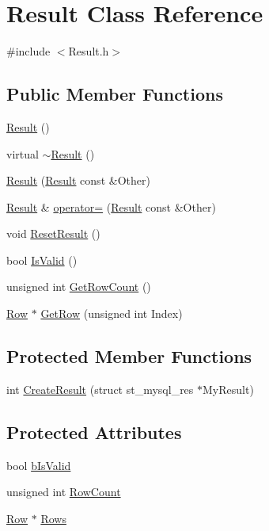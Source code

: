 \hypertarget{class_result}{}\section{Result Class Reference}
\label{class_result}


{\ttfamily \#include $<$Result.\+h$>$}

\subsection*{Public Member Functions}
\begin{DoxyCompactItemize}
\item 
\hyperlink{class_result_a90f44667e23d25ccdeac37f00a74657b}{Result} ()
\item 
virtual \hyperlink{class_result_ab83cf33a31236b3da75d66aaf9a05ed0}{$\sim$\+Result} ()
\item 
\hyperlink{class_result_a3c4a349c3795ad219e8d5ca1d44c62a4}{Result} (\hyperlink{class_result}{Result} const \&Other)
\item 
\hyperlink{class_result}{Result} \& \hyperlink{class_result_abb25eb344b66cd92d9d079dc19bc05e1}{operator=} (\hyperlink{class_result}{Result} const \&Other)
\item 
void \hyperlink{class_result_a806a828b9546dea0761db7a2d01a4563}{Reset\+Result} ()
\item 
bool \hyperlink{class_result_a6dcbd5f9c93b82027e4cfa4db492fe31}{Is\+Valid} ()
\item 
unsigned int \hyperlink{class_result_aedf87b5720707b42129079aba141a267}{Get\+Row\+Count} ()
\item 
\hyperlink{class_row}{Row} $\ast$ \hyperlink{class_result_ad40131fa88f4c69fb6713e51568b86c9}{Get\+Row} (unsigned int Index)
\end{DoxyCompactItemize}
\subsection*{Protected Member Functions}
\begin{DoxyCompactItemize}
\item 
int \hyperlink{class_result_ac36445abfe2d25c756412d3cfed9a2ca}{Create\+Result} (struct st\+\_\+mysql\+\_\+res $\ast$My\+Result)
\end{DoxyCompactItemize}
\subsection*{Protected Attributes}
\begin{DoxyCompactItemize}
\item 
bool \hyperlink{class_result_acfc4ae3c85dc1af5f56667dfbf34ab45}{b\+Is\+Valid}
\item 
unsigned int \hyperlink{class_result_a2ddeda17e557ee6025523df84e14f701}{Row\+Count}
\item 
\hyperlink{class_row}{Row} $\ast$ \hyperlink{class_result_af65d0dbe733d624b6464c022de04a504}{Rows}
\end{DoxyCompactItemize}
